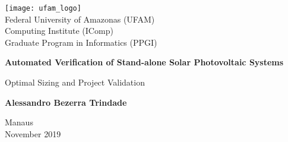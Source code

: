 \begin{titlepage}
    \begin{center}
      \texttt{[image: ufam\_logo]} \\
        \Large
        Federal University of Amazonas (UFAM)\\
        Computing Institute (IComp)\\
        Graduate Program in Informatics (PPGI)\\

        \vspace*{3cm}
        
        \Huge
        \textbf{Automated Verification of Stand-alone Solar Photovoltaic Systems}
        
        \vspace{0.5cm}
        \LARGE
        Optimal Sizing and Project Validation

        \vspace{3.0cm}
        
        \textbf{Alessandro Bezerra Trindade}
        
%        
%        
        \vspace{3cm}
%        
        
        \Large
		Manaus \\

        November 2019 \\


    \end{center}
\end{titlepage}